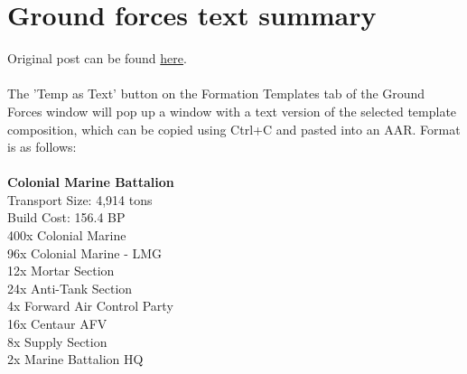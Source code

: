 \documentclass[../../Aurora C# unofficial manual.tex]{subfiles}
\begin{document}
	\section{Ground forces text summary}
	Original post can be found
	\href{http://aurora2.pentarch.org/index.php?topic=8495.msg119028#msg119028}{here}.
	\\\\
	
	The 'Temp as Text' button on the Formation Templates tab of the Ground Forces window will pop up a window with a text version of the selected template composition, which can be copied using Ctrl+C and pasted into an AAR. Format is as follows:\\\\
	\textbf{Colonial Marine Battalion}\\
	Transport Size: 4,914 tons\\
	Build Cost: 156.4 BP\\
	400x Colonial Marine\\
	96x Colonial Marine - LMG\\
	12x Mortar Section\\
	24x Anti-Tank Section\\
	4x Forward Air Control Party\\
	16x Centaur AFV\\
	8x Supply Section\\
	2x Marine Battalion HQ\\\\
	
\end{document}
